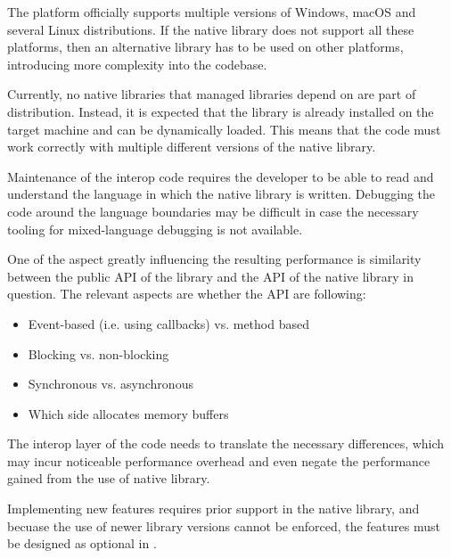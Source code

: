 \begin{itemize}

   The \dotnet{} platform officially supports
    multiple versions of Windows, macOS and several Linux distributions. If the native library does
    not support all these platforms, then an alternative library has to be used on other platforms,
    introducing more complexity into the codebase.

   Currently, no native libraries that managed
    \dotnet{} libraries depend on are part of \dotnet{} distribution. Instead, it is expected that
    the library is already installed on the target machine and can be dynamically loaded. This means
    that the \dotnet{} code must work correctly with multiple different versions of the native
    library.

   Maintenance of the interop code requires the developer to be able to
    read and understand the language in which the native library is written. Debugging the code
    around the language boundaries may be difficult in case the necessary tooling for mixed-language
    debugging is not available.

   One of the aspect greatly influencing the resulting performance is
    similarity between the public API of the \dotnet{} library and the API of the native library in
    question. The relevant aspects are whether the API are following:

    \begin{itemize}
      \item Event-based (i.e\@. using callbacks) vs\@. method based
      \item Blocking vs\@. non-blocking
      \item Synchronous vs\@. asynchronous
      \item Which side allocates memory buffers
    \end{itemize}

    The interop layer of the code needs to translate the necessary differences, which may incur
    noticeable performance overhead and even negate the performance gained from the use of native
    library.

   Implementing new features requires prior support in the native
    library, and becuase the use of newer library versions cannot be enforced, the features must be
    designed as optional in \dotnet{}.

\end{itemize}

